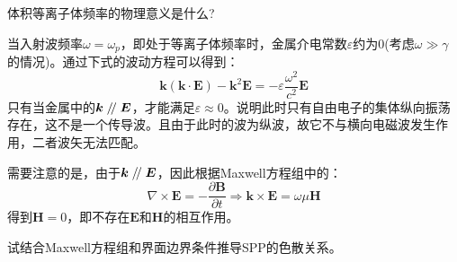\documentclass{hw}
\begin{document}
\begin{problem} %
体积等离子体频率的物理意义是什么?
\end{problem}

\begin{answer*}

当入射波频率$\omega=\omega_p$，即处于等离子体频率时，金属介电常数$\varepsilon$约为$0$(考虑$\omega\gg\gamma$的情况)。通过下式的波动方程可以得到：
\[
\boldsymbol{k}(\boldsymbol{k}\cdot\boldsymbol{E})-\boldsymbol{k}^2\boldsymbol{E}=-\varepsilon\dfrac{\omega^2}{c^2}\boldsymbol{E}
\]
只有当金属中的$\boldsymbol{k}\kern 0.56em/\kern -0.8em /\kern 0.56em\boldsymbol{E}$，才能满足$\varepsilon\approx 0$。说明此时只有自由电子的\textcolor[rgb]{1,0,0}{集体纵向振荡}存在，\textcolor[rgb]{1,0,0}{这不是一个传导波}。且由于此时的波为纵波，故它不与横向电磁波发生作用，二者波矢无法匹配。

需要注意的是，由于$\boldsymbol{k}\kern 0.56em/\kern -0.8em /\kern 0.56em\boldsymbol{E}$，因此根据Maxwell方程组中的：
\[
\nabla\times\boldsymbol{E}=-\dfrac{\partial\boldsymbol{B}}{\partial t}\Rightarrow\boldsymbol{k}\times\boldsymbol{E}=\omega\mu \boldsymbol{H}
\]
得到$\boldsymbol{H}=0$，即不存在$\boldsymbol{E}$和$\boldsymbol{H}$的相互作用。
\end{answer*}

\begin{problem} %
试结合Maxwell方程组和界面边界条件推导SPP的色散关系。
\end{problem}
\end{document}
